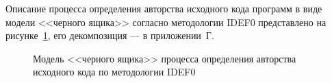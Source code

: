 Описание процесса определения авторства исходного кода программ в виде модели <<черного ящика>> согласно 
методологии IDEF0 представлено на рисунке~\ref{box_1:box_1}, его декомпозиция --- 
в приложении~Г.

\begin{figure}[h!]
\caption{ Модель <<черного ящика>> процесса определения авторства исходного кода по методологии IDEF0 }
\label{box_1:box_1}
\end{figure} 

